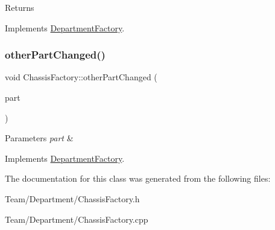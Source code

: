 \begin{DoxyReturn}{Returns}

\end{DoxyReturn}


Implements \hyperlink{classDepartmentFactory_a5aac775b89c4c390ad885e1de8947b0d}{Department\+Factory}.

\mbox{\label{classChassisFactory_a15eb17dfcb995b9dcc75d4908e49a17f}} 
\subsubsection{\texorpdfstring{other\+Part\+Changed()}{otherPartChanged()}}
{\footnotesize\ttfamily void Chassis\+Factory\+::other\+Part\+Changed (\begin{DoxyParamCaption}\item[{\hyperlink{classDepartmentOutput}{Department\+Output} $\ast$}]{part }\end{DoxyParamCaption})\hspace{0.3cm}{\ttfamily [virtual]}}


\begin{DoxyParams}{Parameters}
{\em part} & \\
\hline
\end{DoxyParams}


Implements \hyperlink{classDepartmentFactory_a41e5c96ee84f8237cb08d31cd782efae}{Department\+Factory}.



The documentation for this class was generated from the following files\+:\begin{DoxyCompactItemize}
\item 
Team/\+Department/Chassis\+Factory.\+h\item 
Team/\+Department/Chassis\+Factory.\+cpp\end{DoxyCompactItemize}
